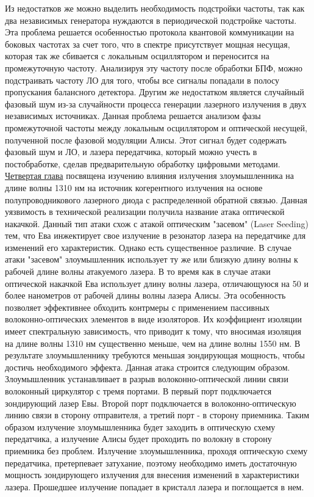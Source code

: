 \newline Из недостатков же можно выделить необходимость подстройки частоты, так как два независимых генератора нуждаются в периодической подстройке частоты. Эта проблема решается особенностью протокола квантовой коммуникации на боковых частотах за счет того, что в спектре присутствует мощная несущая, которая так же сбивается с локальным осциллятором и переносится на промежуточную частоту. Анализируя эту частоту после обработки БПФ, можно подстраивать частоту ЛО для того, чтобы все сигналы попадали в полосу пропускания балансного детектора. Другим же недостатком является случайный фазовый шум из-за случайности процесса генерации лазерного излучения в двух независимых источниках. Данная проблема решается анализом фазы промежуточной частоты между локальным осциллятором и оптической несущей, полученной после фазовой модуляции Алисы. Этот сигнал будет содержать фазовый шум и ЛО, и лазера передатчика, который можно учесть в постобработке, сделав предварительную обработку цифровыми методами. 
\newpage \underline{Четвертая глава} посвящена изучению влияния излучения злоумышленника на длине волны 1310 нм на источник когерентного излучения на основе полупроводникового лазерного диода с распределенной обратной связью. Данная уязвимость в технической реализации получила название атака оптической накачкой. Данный тип атаки схож с атакой оптическим "засевом" (Laser Seeding) тем, что Ева инжектирует свое излучение в резонатор лазера на передатчике для изменений его характеристик. Однако есть существенное различие. В случае атаки "засевом" злоумышленник использует ту же или близкую длину волны к рабочей длине волны атакуемого лазера. В то время как в случае атаки оптической накачкой Ева использует длину волны лазера, отличающуюся на 50 и более нанометров от рабочей длины волны лазера Алисы. Эта особенность позволяет эффективнее обходить контрмеры с применением пассивных волоконно-оптических элементов в виде изоляторов. Их коэффициент изоляции имеет спектральную зависимость, что приводит к тому, что вносимая изоляция на длине волны 1310 нм существенно меньше, чем на длине волны 1550 нм. В результате злоумышленнику требуются меньшая зондирующая мощность, чтобы достичь необходимого эффекта. 
\newline Данная атака строится следующим образом. Злоумышленник устанавливает в разрыв волоконно-оптической линии связи волоконный циркулятор с тремя портами. В первый порт подключается зондирующий лазер Евы. Второй порт подключается в волоконно-оптическую линию связи в сторону отправителя, а третий порт - в сторону приемника. Таким образом излучение злоумышленника будет заходить в оптическую схему передатчика, а излучение Алисы будет проходить по волокну в сторону приемника без проблем. Излучение злоумышленника, проходя оптическую схему передатчика, претерпевает затухание, поэтому необходимо иметь достаточную мощность зондирующего излучения для внесения изменений в характеристики лазера. Прошедшее излучение попадает в кристалл лазера и поглощается в нем.
